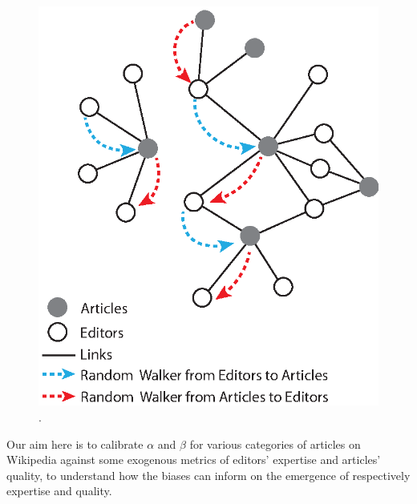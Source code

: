 \begin{figure}[!t]
\centering
\includegraphics[width=0.7\columnwidth]{Figures/bi-partite_net.eps}.
\caption{}
\label{fig:convergence}
\end{figure}

Our aim here is to calibrate $\alpha$ and $\beta$ for various categories of articles on Wikipedia against some exogenous metrics of editors' expertise and articles' quality, to understand how the biases can inform on the emergence of respectively expertise and quality.